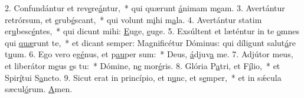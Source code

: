 2. Confundántur et rev\uline{e}re\uline{á}ntur,~* qui quærunt \uline{á}nimam m\uline{e}am.
3. Avertántur retrórsum, et \uline{e}rub\uline{é}scant,~* qui volunt m\uline{i}hi m\uline{a}la.
4. Avertántur statim er\uline{u}besc\uline{é}ntes,~* qui dicunt mihi: \uline{E}uge, \uline{e}uge.
5. Exsúltent et læténtur in te \uline{o}mnes qui \uline{quæ}runt te,~* et dicant semper: Magnificétur Dóminus: qui díligunt salut\uline{á}re t\uline{u}um.
6. Ego vero eg\uline{é}nus, et p\uline{au}per sum:~* Deus, \uline{á}djuv\uline{a} me.
7. Adjútor meus, et liberátor m\uline{e}us \uline{e}s tu:~* Dómine, n\uline{e} mor\uline{é}ris.
8. Glória P\uline{a}tri, et F\uline{í}lio,~* et Spir\uline{í}tui S\uline{a}ncto.
9. Sicut erat in princípio, et n\uline{u}nc, et s\uline{e}mper,~* et in sǽcula sæcul\uline{ó}rum. \uline{A}men.
